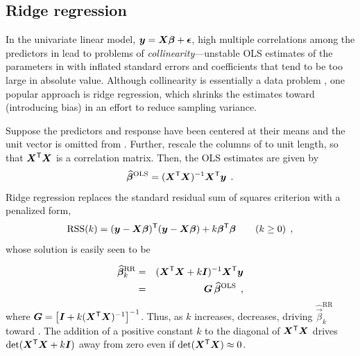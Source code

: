 \subsection{Ridge regression}\label{sec:ridge}

In the univariate linear model, $\bm{y} = \bm{X} \bm{\beta} + \bm{\epsilon}$,
high multiple correlations among the predictors in  lead to problems
of \emph{collinearity}---unstable OLS
estimates of the parameters in \vec{\beta} with inflated standard errors
and coefficients that tend to be too large in absolute value.
Although collinearity is essentially a data problem
\citep{Fox:2008},
one popular approach is ridge regression, which shrinks the estimates toward
 (introducing bias) in an effort to reduce sampling variance.


Suppose the predictors and response have been centered at their means and the unit vector is
omitted from . Further, rescale the columns of  to unit length, so that $\bm{X}^\mathsf{T} \bm{X}$ is a correlation matrix.
Then, the OLS estimates are given by
\begin{equation}
\widehat{\bm{\beta}}^{\mathrm{OLS}} = (\bm{X}^\mathsf{T} \bm{X})^{-1} \bm{X}^\mathsf{T} \bm{y} \:\: .
\end{equation}
Ridge regression replaces the standard residual sum of squares criterion with a penalized
form,
\begin{equation}
\mathrm{RSS}(k) = (\bm{y}-\bm{X} \bm{\beta}) ^\mathsf{T}  (\bm{y}-\bm{X} \bm{\beta}) + k \bm{\beta}^\mathsf{T}\bm{\beta} \quad\quad (k \ge 0)
 \:\: , \label{eq:ridgeRSS}
\end{equation}
whose solution is easily seen to be

\begin{eqnarray}
\widehat{\bm{\beta}}^{\mathrm{RR}}_k  & = &(\bm{X}^\mathsf{T} \bm{X} + k \bm{I})^{-1} \bm{X}^\mathsf{T} \bm{y}  \label{eq:ridge-beta} \\
                                    & = & \bm{G} \, \widehat{\bm{\beta}}^{\mathrm{OLS}}  \nonumber \:\: ,
\end{eqnarray}
where $\bm{G} = \left[\bm{I} + k (\bm{X}^\mathsf{T} \bm{X})^{-1} \right] ^{-1}$.
Thus, as $k$ increases,  decreases, driving $\widehat{\vec{\beta}}^{\mathrm{RR}}_k$ toward 
\citep{HoerlKennard:1970a,HoerlKennard:1970b}.  The addition of a positive constant $k$ to the diagonal of $\bm{X}^\mathsf{T}\bm{X}$
drives $\mathrm{det} (\bm{X}^\mathsf{T}\bm{X}+ k \bm{I})$ away from zero even if $\mathrm{det} (\bm{X}^\mathsf{T}\bm{X})\approx 0$.

